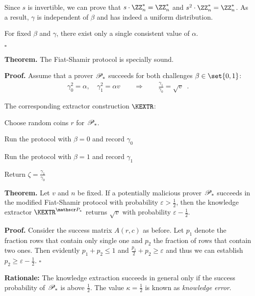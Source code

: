 \documentclass[landscape,footrule]{foils}
\begin{document}
\begin{triangles}
\item Since $s$ is invertible, we can prove that $s\cdot\ZZ_n^*=\ZZ_n^*$
  and $s^2\cdot\ZZ_n^*=\ZZ_n^*$. As a result, $\gamma$ is independent of
  $\beta$ and has indeed a uniform distribution.
  \item For fixed $\beta$ and $\gamma$, there exist only a single consistent value of $\alpha$.
\end{triangles}
{$\square$}


\textbf{Theorem.} The Fiat-Shamir protocol is specially sound.

\textbf{Proof.}  Assume that a prover $\mathscr{P}_*$ succeeds for both
challenges $\beta\in\set{0,1}$:
\begin{align*}
  \gamma_0^2=\alpha,\quad \gamma_1^2=\alpha
  v\qquad\Longrightarrow\qquad
  \frac{\gamma_1}{\gamma_0}=\sqrt{v}\enspace.
\end{align*}

The corresponding extractor construction $\KEXTR$:
\begin{triangles}
  \item Choose random coins $r$ for $\mathscr{P}_*$.  
  \item Run the protocol with $\beta=0$ and record $\gamma_0$
  \item Run the protocol with $\beta=1$ and record $\gamma_1$
  \item Return $\zeta=\frac{\gamma_1}{\gamma_0}$
\end{triangles}


\textbf{Theorem.}  Let $v$ and $n$ be fixed. If a potentially
malicious prover $\mathscr{P}_*$ succeeds in the modified Fiat-Shamir
protocol with probability $\varepsilon> \frac{1}{2}$, then the
knowledge extractor $\KEXTR^{\PROVER_*}$ returns $\sqrt{v}$ with
probability $\varepsilon-\frac{1}{2}$.
\bigskip

\textbf{Proof.}  Consider the success matrix $A(r,c)$ as before.  Let
$p_1$ denote the fraction rows that contain only single one and $p_2$
the fraction of rows that contain two ones. Then evidently
$p_1+p_2\leq 1$ and $\frac{p_1}{2}+ p_2\geq \varepsilon$
and thus we can establish $p_2\geq \varepsilon-\frac{1}{2}$.
$\square$
\Bigskip

\textbf{Rationale:} The knowledge extraction succeeds in general only
if the success probability of $\mathscr{P}_*$ is above $\frac{1}{2}$. The
value $\kappa=\frac{1}{2}$ is known as \emph{knowledge error}.
\end{document}
